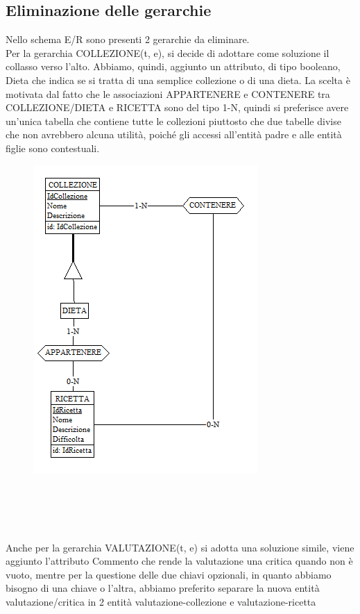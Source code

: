 ﻿\documentclass[a4paper,12pt]{report}
\begin{document}
\subsection{Eliminazione delle gerarchie}
Nello schema E/R sono presenti 2 gerarchie da eliminare.\\
Per la gerarchia COLLEZIONE(t, e), si decide di adottare come soluzione il collasso verso l'alto.
Abbiamo, quindi, aggiunto un attributo, di tipo booleano, Dieta che indica se si tratta di una semplice collezione o di una dieta.
La scelta è motivata dal fatto che le associazioni APPARTENERE e CONTENERE tra COLLEZIONE/DIETA e RICETTA sono del tipo 1-N, quindi si preferisce avere
un'unica tabella che contiene tutte le collezioni piuttosto che due tabelle divise che non avrebbero alcuna utilità, poiché gli accessi all'entità padre e alle entità figlie sono contestuali.\\
\begin{figure}[h!]
    \centering
    \includegraphics[width=0.6\linewidth]{app_images/gerarchia_collezione.png}
\end{figure}
\\\\\\\\Anche per la gerarchia VALUTAZIONE(t, e) si adotta una soluzione simile, viene aggiunto l'attributo Commento 
che rende la valutazione una critica quando non è vuoto, mentre per la questione delle due chiavi opzionali, in quanto abbiamo bisogno di 
una chiave o l'altra, abbiamo preferito separare la nuova entità valutazione/critica in 2 entità valutazione-collezione e valutazione-ricetta \\
\end{document}
